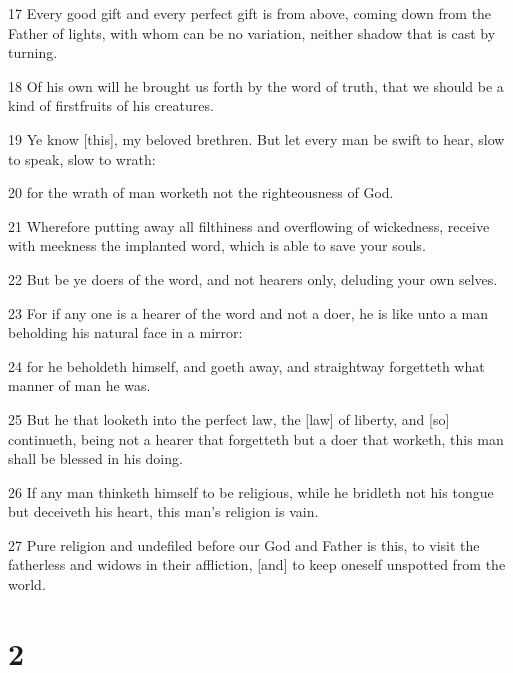 \par 17 Every good gift and every perfect gift is from above, coming down from the Father of lights, with whom can be no variation, neither shadow that is cast by turning.
\par 18 Of his own will he brought us forth by the word of truth, that we should be a kind of firstfruits of his creatures.
\par 19 Ye know [this], my beloved brethren. But let every man be swift to hear, slow to speak, slow to wrath:
\par 20 for the wrath of man worketh not the righteousness of God.
\par 21 Wherefore putting away all filthiness and overflowing of wickedness, receive with meekness the implanted word, which is able to save your souls.
\par 22 But be ye doers of the word, and not hearers only, deluding your own selves.
\par 23 For if any one is a hearer of the word and not a doer, he is like unto a man beholding his natural face in a mirror:
\par 24 for he beholdeth himself, and goeth away, and straightway forgetteth what manner of man he was.
\par 25 But he that looketh into the perfect law, the [law] of liberty, and [so] continueth, being not a hearer that forgetteth but a doer that worketh, this man shall be blessed in his doing.
\par 26 If any man thinketh himself to be religious, while he bridleth not his tongue but deceiveth his heart, this man's religion is vain.
\par 27 Pure religion and undefiled before our God and Father is this, to visit the fatherless and widows in their affliction, [and] to keep oneself unspotted from the world.

\chapter{2}

